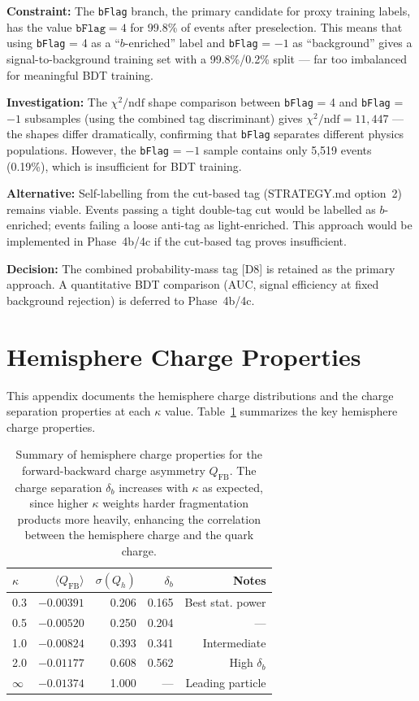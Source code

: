\documentclass[11pt,a4paper]{article}
\begin{document}
\textbf{Constraint:} The \texttt{bFlag} branch, the primary candidate for proxy training
labels, has the value $\texttt{bFlag} = 4$ for 99.8\% of events after preselection. This
means that using \texttt{bFlag} = 4 as a ``$b$-enriched'' label and \texttt{bFlag} = $-1$
as ``background'' gives a signal-to-background training set with a 99.8\%/0.2\% split ---
far too imbalanced for meaningful BDT training.

\textbf{Investigation:} The $\chi^2/\mathrm{ndf}$ shape comparison between
\texttt{bFlag} = 4 and \texttt{bFlag} = $-1$ subsamples (using the combined tag
discriminant) gives $\chi^2/\mathrm{ndf} = 11{,}447$ --- the shapes differ dramatically,
confirming that \texttt{bFlag} separates different physics populations. However, the
\texttt{bFlag} = $-1$ sample contains only 5,519 events (0.19\%), which is insufficient
for BDT training.

\textbf{Alternative:} Self-labelling from the cut-based tag (STRATEGY.md option~2)
remains viable. Events passing a tight double-tag cut would be labelled as $b$-enriched;
events failing a loose anti-tag as light-enriched. This approach would be implemented in
Phase~4b/4c if the cut-based tag proves insufficient.

\textbf{Decision:} The combined probability-mass tag [D8] is retained as the primary
approach. A quantitative BDT comparison (AUC, signal efficiency at fixed background
rejection) is deferred to Phase~4b/4c.

\section{Hemisphere Charge Properties}
\label{app:hemisphere_charge}
\label{sec:jetcharge}

This appendix documents the hemisphere charge distributions and the charge separation
properties at each $\kappa$ value. Table~\ref{tab:hemisphere_charge_properties}
summarizes the key hemisphere charge properties.

\begin{table}[htbp]
\centering
\caption{Summary of hemisphere charge properties for the forward-backward charge
asymmetry $Q_\mathrm{FB}$. The charge separation $\delta_b$ increases with $\kappa$
as expected, since higher $\kappa$ weights harder fragmentation products more heavily,
enhancing the correlation between the hemisphere charge and the quark charge.}
\label{tab:hemisphere_charge_properties}
\begin{tabular}{lrrrr}
\toprule
$\kappa$ & $\langle Q_\mathrm{FB} \rangle$ & $\sigma(Q_h)$ & $\delta_b$ & Notes \\
\midrule
0.3 & $-0.00391$ & 0.206 & 0.165 & Best stat. power \\
0.5 & $-0.00520$ & 0.250 & 0.204 & --- \\
1.0 & $-0.00824$ & 0.393 & 0.341 & Intermediate \\
2.0 & $-0.01177$ & 0.608 & 0.562 & High $\delta_b$ \\
$\infty$ & $-0.01374$ & 1.000 & --- & Leading particle \\
\bottomrule
\end{tabular}
\end{table}
\end{document}
